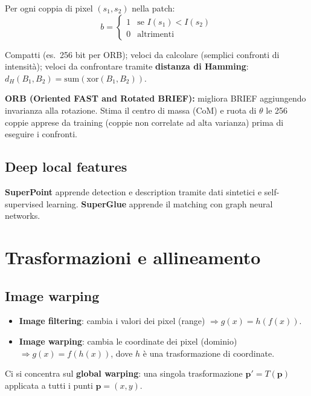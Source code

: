 \documentclass[12pt, a4paper]{report}
\begin{document}
Per ogni coppia di pixel $(s_1,s_2)$ nella patch:
\[
  b=\begin{cases}1&\text{se }I(s_1)<I(s_2)\\0&\text{altrimenti}\end{cases}
\]

\begin{propbox}[Vantaggi]
Compatti (es.\ 256 bit per ORB); veloci da calcolare (semplici confronti di
intensità); veloci da confrontare tramite \textbf{distanza di Hamming}:
$d_H(B_1,B_2)=\mathrm{sum}(\mathrm{xor}(B_1,B_2))$.
\end{propbox}

\textbf{ORB (Oriented FAST and Rotated BRIEF):} migliora BRIEF aggiungendo
invarianza alla rotazione. Stima il centro di massa (CoM) e ruota di $\theta$ le
256 coppie apprese da training (coppie non correlate ad alta varianza) prima di
eseguire i confronti.

\section{Deep local features}

\textbf{SuperPoint} apprende detection e description tramite dati sintetici e
self-supervised learning. \textbf{SuperGlue} apprende il matching con graph
neural networks.

\chapter{Trasformazioni e allineamento}

\section{Image warping}

\begin{itemize}
  \item \textbf{Image filtering}: cambia i valori dei pixel (range)
        $\Rightarrow g(x)=h(f(x))$.
  \item \textbf{Image warping}: cambia le coordinate dei pixel (dominio)
        $\Rightarrow g(x)=f(h(x))$, dove $h$ è una trasformazione di coordinate.
\end{itemize}

Ci si concentra sul \textbf{global warping}: una singola trasformazione
$\mathbf{p}'=T(\mathbf{p})$ applicata a tutti i punti $\mathbf{p}=(x,y)$.
\end{document}
